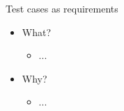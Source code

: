 \begin{Slide}{Test cases as requirements}
\begin{itemize}
\item What?
\begin{itemize}
\item ...
\end{itemize}
\item Why?
\begin{itemize}
\item ...

\end{itemize}
\end{itemize}
\end{Slide}